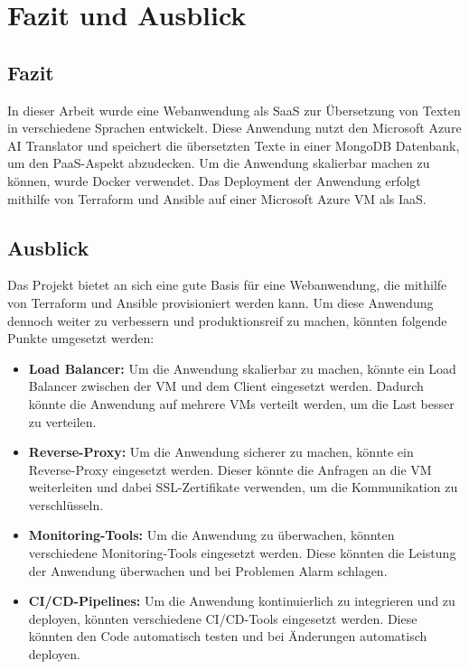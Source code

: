 


\chapter{Fazit und Ausblick}\label{c:4}

\section{Fazit}\label{c:4_s:conclusion}
In dieser Arbeit wurde eine Webanwendung als \ac{SaaS} zur Übersetzung von Texten in verschiedene Sprachen entwickelt. Diese Anwendung nutzt den Microsoft Azure \ac{AI} Translator und speichert die übersetzten Texte in einer MongoDB Datenbank, um den \ac{PaaS}-Aspekt abzudecken. Um die Anwendung skalierbar machen zu können, wurde Docker verwendet. Das Deployment der Anwendung erfolgt mithilfe von Terraform und Ansible auf einer Microsoft Azure \ac{VM} als \ac{IaaS}.


\section{Ausblick}\label{c:4_s:outlook}
Das Projekt bietet an sich eine gute Basis für eine Webanwendung, die mithilfe von Terraform und Ansible provisioniert werden kann. Um diese Anwendung dennoch weiter zu verbessern und produktionsreif zu machen, könnten folgende Punkte umgesetzt werden:

\begin{itemize}
    \item \textbf{Load Balancer:} Um die Anwendung skalierbar zu machen, könnte ein Load Balancer zwischen der \ac{VM} und dem Client eingesetzt werden. Dadurch könnte die Anwendung auf mehrere \ac{VM}s verteilt werden, um die Last besser zu verteilen.
    
    \item \textbf{Reverse-Proxy:} Um die Anwendung sicherer zu machen, könnte ein Reverse-Proxy eingesetzt werden. Dieser könnte die Anfragen an die \ac{VM} weiterleiten und dabei SSL-Zertifikate verwenden, um die Kommunikation zu verschlüsseln. 
    
    \item \textbf{Monitoring-Tools:} Um die Anwendung zu überwachen, könnten verschiedene Monitoring-Tools eingesetzt werden. Diese könnten die Leistung der Anwendung überwachen und bei Problemen Alarm schlagen.
    
    \item \textbf{\ac{CI}/\ac{CD}-Pipelines:} Um die Anwendung kontinuierlich zu integrieren und zu deployen, könnten verschiedene CI/CD-Tools eingesetzt werden. Diese könnten den Code automatisch testen und bei Änderungen automatisch deployen.
\end{itemize}
